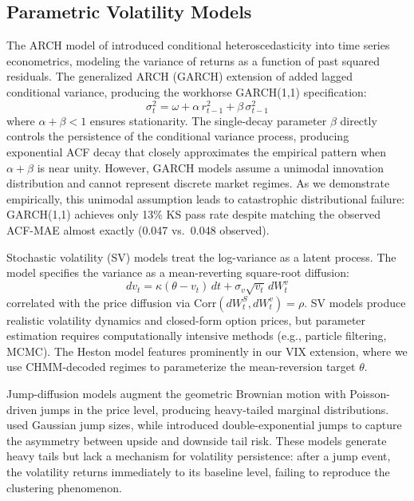 \subsection{Parametric Volatility Models}

The ARCH model of \citet{engle1982autoregressive} introduced conditional heteroscedasticity into time series econometrics, modeling the variance of returns as a function of past squared residuals.
The generalized ARCH (GARCH) extension of \citet{bollerslev1986generalized} added lagged conditional variance, producing the workhorse GARCH(1,1) specification:
\begin{equation}
    \sigma_t^2 = \omega + \alpha\, r_{t-1}^2 + \beta\, \sigma_{t-1}^2
    \label{eq:garch_lit}
\end{equation}
where $\alpha + \beta < 1$ ensures stationarity.
The single-decay parameter $\beta$ directly controls the persistence of the conditional variance process, producing exponential ACF decay that closely approximates the empirical pattern when $\alpha + \beta$ is near unity.
However, GARCH models assume a unimodal innovation distribution and cannot represent discrete market regimes.
As we demonstrate empirically, this unimodal assumption leads to catastrophic distributional failure: GARCH(1,1) achieves only 13\% KS pass rate despite matching the observed ACF-MAE almost exactly (0.047 vs.\ 0.048 observed).

Stochastic volatility (SV) models treat the log-variance as a latent process.
The \citet{heston1993closed} model specifies the variance as a mean-reverting square-root diffusion:
\begin{equation}
    dv_t = \kappa(\theta - v_t)\,dt + \sigma_v \sqrt{v_t}\,dW_t^v
    \label{eq:heston_lit}
\end{equation}
correlated with the price diffusion via $\text{Corr}(dW_t^S, dW_t^v) = \rho$.
SV models produce realistic volatility dynamics and closed-form option prices, but parameter estimation requires computationally intensive methods (e.g., particle filtering, MCMC).
The Heston model features prominently in our VIX extension, where we use CHMM-decoded regimes to parameterize the mean-reversion target $\theta$.

Jump-diffusion models \citep{merton1976option, kou2002jump} augment the geometric Brownian motion with Poisson-driven jumps in the price level, producing heavy-tailed marginal distributions.
\citet{merton1976option} used Gaussian jump sizes, while \citet{kou2002jump} introduced double-exponential jumps to capture the asymmetry between upside and downside tail risk.
These models generate heavy tails but lack a mechanism for volatility persistence: after a jump event, the volatility returns immediately to its baseline level, failing to reproduce the clustering phenomenon.

